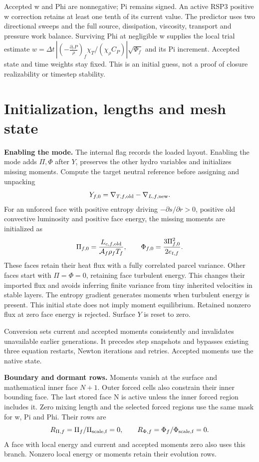 \documentclass[11pt]{article}
\newcommand{\code}[1]{\texttt{\detokenize{#1}}}
\newcommand{\area}{\mathcal A}
\newcommand{\buo}{\left(-\frac{\partial_r P}{\rho}\right)}
\numberwithin{equation}{section}
\begin{document}
Accepted w and Phi are nonnegative; Pi remains signed. An active RSP3
positive w correction retains at least one tenth of its current value.
The predictor uses two directional sweeps and the full source, dissipation,
viscosity, transport and pressure work balance. Surviving Phi at negligible
w supplies the local trial estimate
$w=\Delta t\,|\buo_f\chi_T/(\chi_\rho C_P)|\sqrt{\Phi_f}$ and its Pi increment.
Accepted state and time weights stay fixed. This is an initial guess,
not a proof of closure realizability or timestep stability.

\clearpage
\section{Initialization, lengths and mesh state}
\textbf{Enabling the mode.}
The internal flag records the loaded layout. Enabling the mode adds
$\Pi,\Phi$ after $Y$, preserves the other hydro variables and initializes
missing moments. Compute the target neutral reference before assigning
and unpacking
\begin{equation}
 Y_{f,0}=\nabla_{T,f,\rm old}-\nabla_{L,f,\rm new}.
\end{equation}
For an unforced face with positive entropy driving
$-\partial s/\partial r>0$, positive old convective luminosity and
positive face energy, the missing moments are initialized as
\begin{equation}
 \Pi_{f,0}=\frac{L_{c,f,\rm old}}{\area_f\rho_fT_f},
 \qquad
 \Phi_{f,0}=\frac{3\Pi_{f,0}^2}{2e_{t,f}}.
\end{equation}
These faces retain their heat flux with a fully correlated parcel variance.
Other faces start with $\Pi=\Phi=0$, retaining face turbulent energy.
This changes their imported flux and avoids inferring finite variance
from tiny inherited velocities in stable layers. The entropy gradient
generates moments when turbulent energy is present. This initial state
does not imply moment equilibrium. Retained nonzero flux at zero face
energy is rejected. Surface $Y$ is reset to zero.

Conversion sets current and accepted moments consistently and invalidates
unavailable earlier generations. It precedes step snapshots and bypasses
existing three equation restarts, Newton iterations and retries.
Accepted moments use the native \code{xh_start} state.

\textbf{Boundary and dormant rows.}
Moments vanish at the surface and mathematical inner face $N+1$.
Outer forced cells also constrain their inner bounding face. The last
stored face N is active unless the inner forced region includes it.
Zero mixing length and the selected forced regions use the same mask for w,
Pi and Phi. Their rows are
\begin{equation}
 R_{\Pi,f}=\Pi_f/\Pi_{\rm scale,f}=0,\qquad
 R_{\Phi,f}=\Phi_f/\Phi_{\rm scale,f}=0 .
\end{equation}
A face with local energy and current and accepted moments zero also uses
this branch. Nonzero local energy or moments retain their evolution rows.
\end{document}
